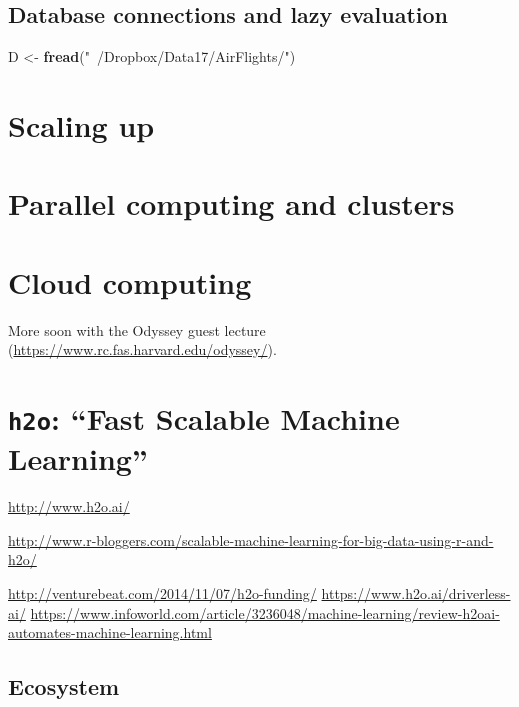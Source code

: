 \documentclass[]{book}
\newenvironment{Shaded}{\begin{snugshade}}{\end{snugshade}}
\newcommand{\KeywordTok}[1]{\textcolor[rgb]{0.13,0.29,0.53}{\textbf{#1}}}
\newcommand{\StringTok}[1]{\textcolor[rgb]{0.31,0.60,0.02}{#1}}
\newcommand{\NormalTok}[1]{#1}
\theoremstyle{definition}
\theoremstyle{definition}
\theoremstyle{definition}
\theoremstyle{remark}
\begin{document}
\subsection{Database connections and lazy
evaluation}\label{database-connections-and-lazy-evaluation}

\begin{Shaded}
\begin{Highlighting}[]
\NormalTok{D <-}\StringTok{ }\KeywordTok{fread}\NormalTok{(}\StringTok{"~/Dropbox/Data17/AirFlights/"}\NormalTok{)}
\end{Highlighting}
\end{Shaded}

\section{Scaling up}\label{scaling-up}

\section{Parallel computing and
clusters}\label{parallel-computing-and-clusters}

\section{Cloud computing}\label{cloud-computing}

More soon with the Odyssey guest lecture
(\url{https://www.rc.fas.harvard.edu/odyssey/}).

\section{\texorpdfstring{\texttt{h2o}: ``Fast Scalable Machine
Learning''}{h2o: Fast Scalable Machine Learning}}\label{h2o-fast-scalable-machine-learning}

\url{http://www.h2o.ai/}

\url{http://www.r-bloggers.com/scalable-machine-learning-for-big-data-using-r-and-h2o/}

\url{http://venturebeat.com/2014/11/07/h2o-funding/}
\url{https://www.h2o.ai/driverless-ai/}
\url{https://www.infoworld.com/article/3236048/machine-learning/review-h2oai-automates-machine-learning.html}

\subsection{Ecosystem}\label{ecosystem}
\end{document}
